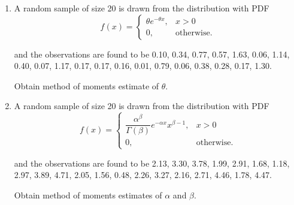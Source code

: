 \documentclass[11pt, a4paper]{article}
\begin{document}
\begin{enumerate}
	
	
	
	
	
	
	\item A random sample of size 20 is drawn from the distribution with PDF
	\begin{equation*}
	 f(x) =
		\begin{cases}
		 \theta e^{-\theta x}, & x > 0  \\
		 0, & \text{otherwise}.
		\end{cases}
	\end{equation*}
	
and the observations are found to be 0.10, 0.34, 0.77, 0.57, 1.63, 0.06, 1.14, 0.40, 0.07, 1.17, 0.17, 0.17, 0.16, 0.01, 0.79, 0.06, 0.38, 0.28, 0.17, 1.30.

Obtain method of moments estimate of $\theta$.
	
	
	
	
	
	\item A random sample of size 20 is drawn from the distribution with PDF
	\begin{equation*}
	 f(x) =
		\begin{cases}
		 \dfrac{\alpha^{\beta}}{\Gamma(\beta)} e^{-\alpha x}x^{\beta - 1}, & x > 0  \\
		 0, & \text{otherwise}.
		\end{cases}
	\end{equation*}
	
and the observations are found to be 2.13, 3.30, 3.78, 1.99, 2.91, 1.68, 1.18, 2.97, 3.89, 4.71, 2.05, 1.56, 0.48, 2.26, 3.27, 2.16, 2.71, 4.46, 1.78, 4.47.

Obtain method of moments estimates of $\alpha$ and $\beta$.
\end{enumerate}
\end{document}
